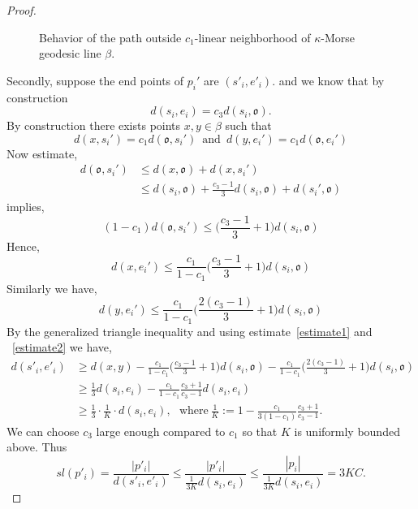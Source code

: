 \documentclass[12 pt]{amsart}
\newcommand{\gothic}{\mathfrak}
\newcommand{\go}{{\gothic o}}
\theoremstyle{definition}
\theoremstyle{remark}
\begin{document}
\begin{proof}
\begin{figure}
\begin{tikzpicture}[x=0.75pt,y=0.75pt,yscale=-1,xscale=1]
\end{tikzpicture}
  \caption{Behavior of the path outside $c_1$-linear neighborhood of $\kappa$-Morse geodesic line $\beta$.}
    \label{fig:enter-label}
\end{figure}
Secondly, suppose the end points of $p_i'$ are $(s'_i, e'_i)$. 
  and we know that by construction \[
  d(s_i, e_i) = c_3 d(s_i, \go).
  \]
  By construction there exists points $x, y \in \beta$ such that
  \[d(x, s_i') = c_1 d(\go, s_i') \,\text{ and }\, d(y, e_i') = c_1 d(\go, e_i')\]
  Now estimate,
 \begin{align*}
 d(\go,s_i')
 &\leq d(x,\go)+d(x,s_i')\\
 &\leq d(s_i,\go)+\frac{c_3-1}{3}d(s_i,\go)+d(s_i',\go)
 \end{align*} implies,
 \[(1-c_1)d(\go,s_i')\leq  \bigg(\frac{c_3-1}{3} +1\bigg)d(s_i, \go)\]
 Hence,
 \begin{equation}\label{estimate1}
   d(x,e_i')\leq \frac{c_1}{1-c_1} \bigg(\frac{c_3-1}{3} +1\bigg)d(s_i, \go)
   \end{equation}
Similarly we have,
\begin{equation}\label{estimate2}
 d(y,e_i')\leq \frac{c_1}{1-c_1} \bigg(\frac{2(c_3-1)}{3} +1\bigg)d(s_i, \go)   
\end{equation}   
 By the generalized triangle inequality and using estimate~\ref{estimate1} and ~\ref{estimate2} we have, 
 \begin{align*}
   d(s'_i, e'_i) 
   &\geq d(x, y) -\frac{c_1}{1-c_1} \bigg(\frac{c_3-1}{3} +1\bigg)d(s_i, \go)- \frac{c_1}{1-c_1} \bigg(\frac{2(c_3-1)}{3} +1\bigg)d(s_i, \go)\\
   & \geq \frac{1}{3}d(s_i,e_i)-\frac{c_1}{1-c_1}\frac{c_3+1}{c_3-1}d(s_i,e_i)\\
   & \geq \frac{1}{3} \cdot \frac{1}{K}\cdot d(s_i,e_i), \ \  \ \text{where}\ \frac{1}{K} :=1- \frac{c_1}{3(1-c_1)}\frac{c_3+1}{c_3-1}.
 \end{align*}
 We can choose $c_3$ large enough compared to $c_1$ so that $K$ is uniformly bounded above. 
  Thus 
  \[ sl(p'_i) = \frac{|p'_i|}{d(s'_i, e'_i)} \leq \frac{|p'_i|}{\frac{1}{3K}d(s_i, e_i)} \leq
   \frac{|p_i|}{\frac{1}{3K}d(s_i, e_i)} = 3KC.\]
   
 

\end{proof}
\end{document}
